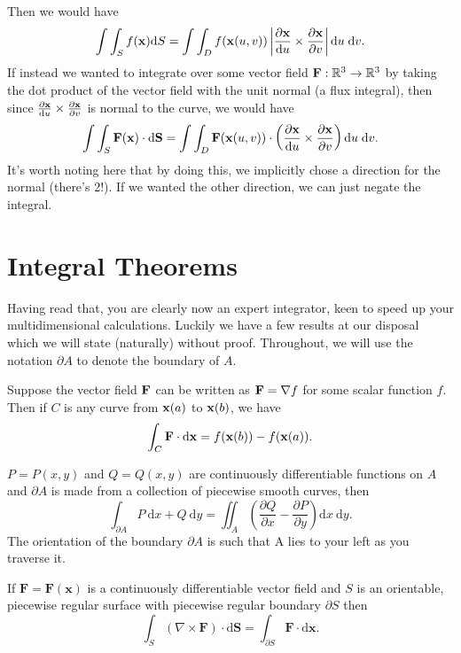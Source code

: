 \documentclass[11pt]{article}
\begin{document}
Then we would have
$$
\int \int_S f(\mathbf{x}) \dd S = \int \int_D f(\mathbf{x}(u, v)) \left|\frac{\partial \mathbf{x}}{\dd u} \times \frac{\partial \mathbf{x}}{\partial v}\right| \dd u\; \dd v.
$$
If instead we wanted to integrate over some vector field $\mathbf{F} : \mathbb{R}^3 \rightarrow \mathbb{R}^3$ by taking the dot product of the vector field with the unit normal (a flux integral), then since $\frac{\partial \mathbf{x}}{\dd u} \times \frac{\partial \mathbf{x}}{\partial v}$ is normal to the curve, we would have
$$
\int \int_S \mathbf{F}(\mathbf{x}) \cdot \dd \mathbf{S} = \int \int_D \mathbf{F}(\mathbf{x}(u, v)) \cdot \left(\frac{\partial \mathbf{x}}{\dd u} \times \frac{\partial \mathbf{x}}{\partial v} \right)\dd u\; \dd v.
$$
It's worth noting here that by doing this, we implicitly chose a direction for the normal (there's 2!). If we wanted the other direction, we can just negate the integral. 
\clearpage
\section{Integral Theorems}

Having read that, you are clearly now an expert integrator, keen to speed up your multidimensional calculations. Luckily we have a few results at our disposal which we will state (naturally) without proof. Throughout, we will use the notation $\partial A$ to denote the boundary of $A$.

\begin{theorem}
	Suppose the vector field $\mathbf{F}$ can be written as $\mathbf{F} = \nabla f$ for some scalar function $f$. Then if $C$ is any curve from $\mathbf{x}(a)$ to $\mathbf{x}(b)$, we have
	$$
	\int_C \mathbf{F} \cdot \dd \mathbf{x} = f(\mathbf{x}(b)) - f(\mathbf{x}(a)).
	$$
\end{theorem}

\begin{theorem}
	$P=P(x, y)$ and $Q=Q(x, y)$ are continuously differentiable functions on $A$ and $\partial A$ is made from a collection of piecewise smooth curves, then
$$
\int_{\partial A} P \mathrm{~d} x+Q \mathrm{~d} y=\iint_{A}\left(\frac{\partial Q}{\partial x}-\frac{\partial P}{\partial y}\right) \mathrm{d} x \mathrm{~d} y .
$$
The orientation of the boundary $\partial A$ is such that A lies to your left as you traverse it.
\end{theorem}

\begin{theorem}
If $\mathbf{F}=\mathbf{F}(\mathbf{x})$ is a continuously differentiable vector field and $S$ is an orientable, piecewise regular surface with piecewise regular boundary $\partial S$ then
$$
\int_{S}(\nabla \times \mathbf{F}) \cdot \mathrm{d} \mathbf{S}=\int_{\partial S} \mathbf{F} \cdot \mathrm{d} \mathbf{x}.
$$
\end{theorem}
\end{document}
